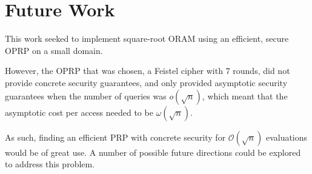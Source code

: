 \section{Future Work}

This work seeked to implement square-root ORAM using an 
efficient, secure OPRP on a small domain.

However, the OPRP that was chosen, a Feistel cipher with 7 rounds,
did not provide concrete security guarantees,
and only provided asymptotic security guarantees when the number
of queries was  $o(\sqrt{n})$, which meant that
the asymptotic cost per access needed to be $\omega(\sqrt{n})$.

As such, finding an efficient PRP with concrete security for $\mathcal{O}(\sqrt{n})$
evaluations would be of great use.
A number of possible future directions could be explored to address this problem.


